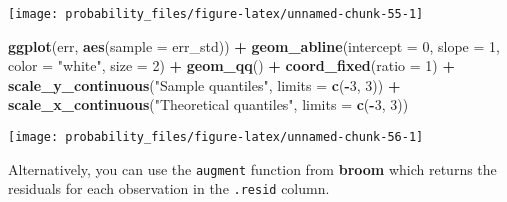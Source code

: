 \documentclass[]{book}
\newenvironment{Shaded}{\begin{snugshade}}{\end{snugshade}}
\newcommand{\KeywordTok}[1]{\textcolor[rgb]{0.13,0.29,0.53}{\textbf{#1}}}
\newcommand{\DataTypeTok}[1]{\textcolor[rgb]{0.13,0.29,0.53}{#1}}
\newcommand{\DecValTok}[1]{\textcolor[rgb]{0.00,0.00,0.81}{#1}}
\newcommand{\StringTok}[1]{\textcolor[rgb]{0.31,0.60,0.02}{#1}}
\newcommand{\OperatorTok}[1]{\textcolor[rgb]{0.81,0.36,0.00}{\textbf{#1}}}
\newcommand{\NormalTok}[1]{#1}
\theoremstyle{definition}
\theoremstyle{definition}
\theoremstyle{definition}
\theoremstyle{remark}
\begin{document}
\begin{center}\texttt{[image: probability\_files/figure-latex/unnamed-chunk-55-1]} \end{center}

\begin{Shaded}
\begin{Highlighting}[]
\KeywordTok{ggplot}\NormalTok{(err, }\KeywordTok{aes}\NormalTok{(}\DataTypeTok{sample =}\NormalTok{ err_std)) }\OperatorTok{+}
\StringTok{  }\KeywordTok{geom_abline}\NormalTok{(}\DataTypeTok{intercept =} \DecValTok{0}\NormalTok{, }\DataTypeTok{slope =} \DecValTok{1}\NormalTok{, }\DataTypeTok{color =} \StringTok{"white"}\NormalTok{, }\DataTypeTok{size =} \DecValTok{2}\NormalTok{) }\OperatorTok{+}
\StringTok{  }\KeywordTok{geom_qq}\NormalTok{() }\OperatorTok{+}
\StringTok{  }\KeywordTok{coord_fixed}\NormalTok{(}\DataTypeTok{ratio =} \DecValTok{1}\NormalTok{) }\OperatorTok{+}
\StringTok{  }\KeywordTok{scale_y_continuous}\NormalTok{(}\StringTok{"Sample quantiles"}\NormalTok{, }\DataTypeTok{limits =} \KeywordTok{c}\NormalTok{(}\OperatorTok{-}\DecValTok{3}\NormalTok{, }\DecValTok{3}\NormalTok{)) }\OperatorTok{+}
\StringTok{  }\KeywordTok{scale_x_continuous}\NormalTok{(}\StringTok{"Theoretical quantiles"}\NormalTok{, }\DataTypeTok{limits =} \KeywordTok{c}\NormalTok{(}\OperatorTok{-}\DecValTok{3}\NormalTok{, }\DecValTok{3}\NormalTok{))}
\end{Highlighting}
\end{Shaded}

\begin{center}\texttt{[image: probability\_files/figure-latex/unnamed-chunk-56-1]} \end{center}

Alternatively, you can use the \texttt{augment} function from
\textbf{broom} which returns the residuals for each observation in the
\texttt{.resid} column.
\end{document}
